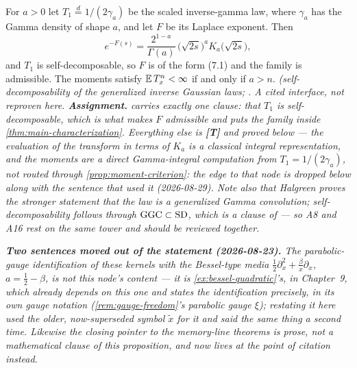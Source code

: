 \begin{proposition}\label{prop:bessel-family}
For $a > 0$ let $T_1 \stackrel{d}{=} 1/(2\gamma_a)$ be the scaled inverse-gamma law, where
$\gamma_a$ has the Gamma density of shape $a$, and let $F$ be its Laplace exponent. Then
\[
  e^{-F(s)} = \frac{2^{1-a}}{\Gamma(a)}\,\bigl(\sqrt{2s}\bigr)^{a} K_a\bigl(\sqrt{2s}\bigr),
\]
and $T_1$ is self-decomposable, so $F$ is of the form (7.1) and the family is admissible. The
moments satisfy $\mathbb{E}\,T_x^n < \infty$ if and only if $a > n$.
\statusA\quad{}\quad\emph{(self-decomposability of the generalized inverse Gaussian
laws; . A cited interface, not reproven here.
\textbf{Assignment.}  carries exactly one clause: that $T_1$ is self-decomposable,
which is what makes $F$ admissible and puts the family inside
\ref{thm:main-characterization}. Everything else is \textbf{[T]} and proved below --- the
evaluation of the transform in terms of $K_a$ is a classical integral representation, and the
moments are a direct Gamma-integral computation from $T_1 = 1/(2\gamma_a)$, not routed through
\ref{prop:moment-criterion}: the edge to that node is dropped below along with the sentence that
used it (2026-08-29). Note also that Halgreen proves the
stronger statement that the law is a generalized Gamma convolution; self-decomposability
follows through $\mathrm{GGC} \subset \mathrm{SD}$, which is a clause of  --- so A8 and A16
rest on the same tower and should be reviewed together.}

\emph{\textbf{Two sentences moved out of the statement (2026-08-23).} The parabolic-gauge
identification of these kernels with the Bessel-type media
$\tfrac12\partial_x^2 + \tfrac{\beta}{x}\partial_x$, $a = \tfrac12 - \beta$, is not this node's
content --- it is \ref{ex:bessel-quadratic}'s, in Chapter~9, which already depends on this one
and states the identification precisely, in its own gauge notation
(\ref{rem:gauge-freedom}'s parabolic gauge $\xi$); restating it here used the older, now-superseded
symbol $\tilde x$ for it and said the same thing a second time. Likewise the closing pointer to
the memory-line theorems is prose, not a mathematical clause of this proposition, and now lives
at the point of citation instead.}
\end{proposition}

